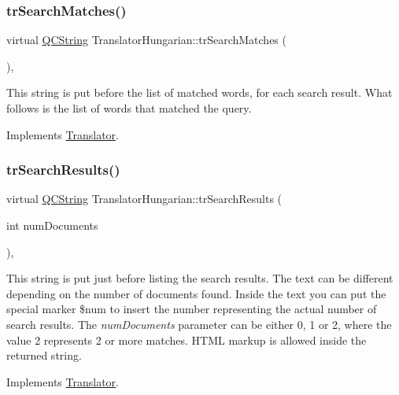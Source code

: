 \subsubsection{\texorpdfstring{trSearchMatches()}{trSearchMatches()}}
{\footnotesize\ttfamily virtual \mbox{\hyperlink{class_q_c_string}{Q\+C\+String}} Translator\+Hungarian\+::tr\+Search\+Matches (\begin{DoxyParamCaption}{ }\end{DoxyParamCaption})\hspace{0.3cm}{\ttfamily [inline]}, {\ttfamily [virtual]}}

This string is put before the list of matched words, for each search result. What follows is the list of words that matched the query. 

Implements \mbox{\hyperlink{class_translator}{Translator}}.

\mbox{\label{class_translator_hungarian_a4b9bccef48cb366e4e33e92ec9268257}} 
\subsubsection{\texorpdfstring{trSearchResults()}{trSearchResults()}}
{\footnotesize\ttfamily virtual \mbox{\hyperlink{class_q_c_string}{Q\+C\+String}} Translator\+Hungarian\+::tr\+Search\+Results (\begin{DoxyParamCaption}\item[{int}]{num\+Documents }\end{DoxyParamCaption})\hspace{0.3cm}{\ttfamily [inline]}, {\ttfamily [virtual]}}

This string is put just before listing the search results. The text can be different depending on the number of documents found. Inside the text you can put the special marker \$num to insert the number representing the actual number of search results. The {\itshape num\+Documents} parameter can be either 0, 1 or 2, where the value 2 represents 2 or more matches. H\+T\+ML markup is allowed inside the returned string. 

Implements \mbox{\hyperlink{class_translator}{Translator}}.

\mbox{\label{class_translator_hungarian_a6d1da7836a3ed2fd07be974679dbb05f}} 
